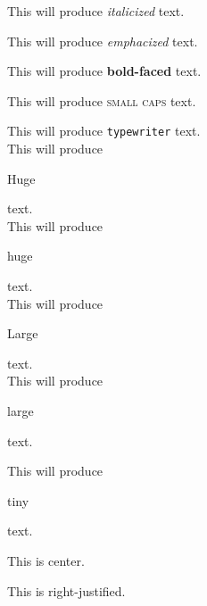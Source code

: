 \documentclass[12pt,a4paper]{article}
\begin{document}
This will produce \textit{italicized} text.

This will produce \emph{emphacized} text.

This will produce \textbf{bold-faced} text.

This will produce \textsc{small caps} text.

This will produce \texttt{typewriter} text.\\ %

This will produce \begin{Huge}Huge\end{Huge} text.\\

This will produce \begin{huge}huge\end{huge} text.\\

This will produce \begin{Large}Large\end{Large} text.\\

This will produce \begin{large}large\end{large} text.

This will produce \begin{tiny}tiny\end{tiny} text.

\begin{center}
  This is center.
\end{center}

\begin{flushright}
  This is right-justified.
\end{flushright}
  
\end{document}
